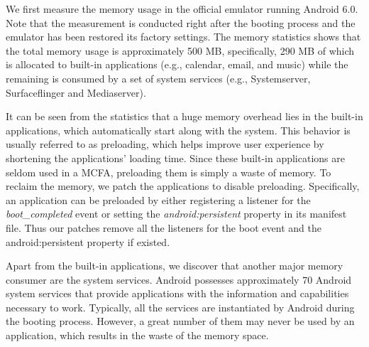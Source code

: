 \documentclass[conference]{IEEEtranl}
\begin{document}
	We first measure the memory usage in the official emulator running Android 6.0. Note that the measurement is conducted right after the booting process and the emulator has been restored its factory settings. 
	The memory statistics shows that the total memory usage is approximately 500 MB, specifically, 290 MB of which is allocated to built-in applications (e.g., calendar, email, and music) while the remaining is consumed by a set of system services (e.g., Systemserver, Surfaceflinger and Mediaserver).

	It can be seen from the statistics that a huge memory overhead lies in the built-in applications, which automatically start along with the system. This behavior is usually referred to as preloading, which helps improve user experience by shortening the applications' loading time. Since these built-in applications are seldom used in a MCFA, preloading them is simply a waste of memory. To reclaim the memory, we patch the applications to disable preloading. Specifically, an application can be preloaded by either registering a listener for the \textit{boot\_completed} event or setting the  \textit{android:persistent} property in its manifest file. Thus our patches remove all the listeners for the boot event and the android:persistent property if existed.

	Apart from the built-in applications, we discover that another major memory consumer are the system services. Android possesses approximately 70 Android system services that provide applications with the information and capabilities necessary to work. 
	Typically, all the services are instantiated by Android during the booting process. However, a great number of them may never be used by an application, which results in the waste of the memory space. 


\end{document}
